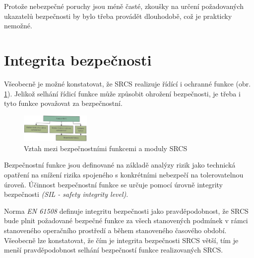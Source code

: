       Protože nebezpečné poruchy jsou méně časté, zkoušky na určení požadovaných ukazatelů
      bezpečnosti by bylo třeba provádět dlouhodobě, což je prakticky nemožné. 
    
  \section{Integrita bezpečnosti}
    Všeobecně je možné konstatovat, že SRCS realizuje řídící i ochranné funkce (obr. \ref{DZT:fig_DZT_SRCS_fce}). Jelikož selhání řídicí funkce může způsobit ohrožení bezpečnosti,
    je třeba i tyto funkce považovat za bezpečnostní.
    \begin{figure}[hb!]
      \centering
      \includegraphics[width=0.3\textwidth]{DZT_SRCS_fce.jpg}
      \caption{Vztah mezi bezpečnostními funkcemi a moduly SRCS}
      \label{DZT:fig_DZT_SRCS_fce}
    \end{figure}    
    Bezpečnostní funkce jsou definované na základě analýzy rizik jako technická opatření na snížení
    rizika spojeného s konkrétními nebezpečí na tolerovatelnou úroveň. Účinnost bezpečnostní funkce
    se určuje pomocí úrovně integrity bezpečnosti \emph{(SIL - safety integrity level)}. 
    
    Norma \emph{EN 61508} definuje integritu bezpečnosti jako pravděpodobnost, že SRCS bude plnit 
    požadované bezpečné funkce za všech stanovených podmínek v rámci stanoveného operačního 
    prostředí a během stanoveného časového období. Všeobecně lze konstatovat, že čím je integrita
    bezpečnosti SRCS větší, tím je menší pravděpodobnost selhání bezpečností funkce realizovaných
    SRCS.  
    

